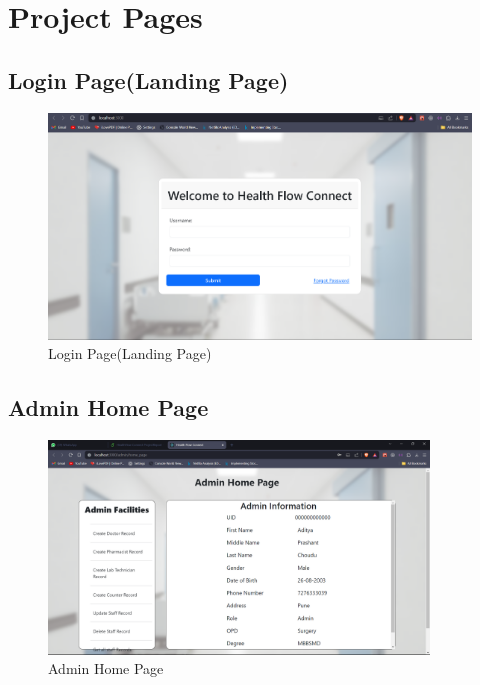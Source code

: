 \section{Project Pages}
\subsection{Login Page(Landing Page)}
\begin{figure}[h!]
    \centering
    \includegraphics[width=\textwidth]{Website_Landing_page.png}
    \caption{Login Page(Landing Page)}
\end{figure}
\subsection{Admin Home Page}
\begin{figure}[h!]
    \centering
    \includegraphics[width=0.9\textwidth]{Admin_Home_Page.png}
    \caption{Admin Home Page}
\end{figure}

\clearpage
